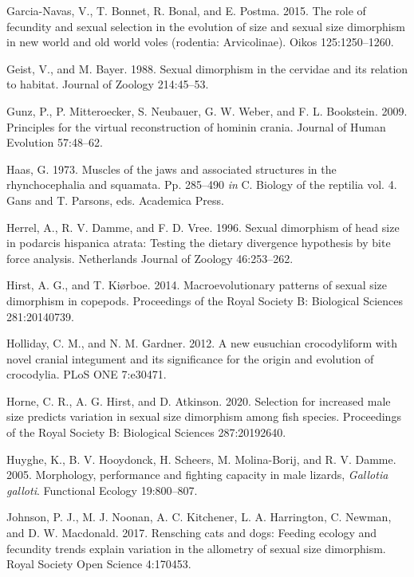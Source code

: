 \documentclass[]{article}
\begin{document}
\hypertarget{ref-Garcia-Navas2015}{}
Garcia-Navas, V., T. Bonnet, R. Bonal, and E. Postma. 2015. The role of
fecundity and sexual selection in the evolution of size and sexual size
dimorphism in new world and old world voles (rodentia: Arvicolinae).
Oikos 125:1250--1260.

\hypertarget{ref-Geist1988}{}
Geist, V., and M. Bayer. 1988. Sexual dimorphism in the cervidae and its
relation to habitat. Journal of Zoology 214:45--53.

\hypertarget{ref-Gunz2009}{}
Gunz, P., P. Mitteroecker, S. Neubauer, G. W. Weber, and F. L.
Bookstein. 2009. Principles for the virtual reconstruction of hominin
crania. Journal of Human Evolution 57:48--62.

\hypertarget{ref-Haas1973}{}
Haas, G. 1973. Muscles of the jaws and associated structures in the
rhynchocephalia and squamata. Pp. 285--490 \emph{in} C. Biology of the
reptilia vol. 4. Gans and T. Parsons, eds. Academica Press.

\hypertarget{ref-Herrel1996}{}
Herrel, A., R. V. Damme, and F. D. Vree. 1996. Sexual dimorphism of head
size in podarcis hispanica atrata: Testing the dietary divergence
hypothesis by bite force analysis. Netherlands Journal of Zoology
46:253--262.

\hypertarget{ref-Hirst2014}{}
Hirst, A. G., and T. Kiørboe. 2014. Macroevolutionary patterns of sexual
size dimorphism in copepods. Proceedings of the Royal Society B:
Biological Sciences 281:20140739.

\hypertarget{ref-Holliday2012}{}
Holliday, C. M., and N. M. Gardner. 2012. A new eusuchian crocodyliform
with novel cranial integument and its significance for the origin and
evolution of crocodylia. PLoS ONE 7:e30471.

\hypertarget{ref-Horne2020}{}
Horne, C. R., A. G. Hirst, and D. Atkinson. 2020. Selection for
increased male size predicts variation in sexual size dimorphism among
fish species. Proceedings of the Royal Society B: Biological Sciences
287:20192640.

\hypertarget{ref-HUYGHE2005}{}
Huyghe, K., B. V. Hooydonck, H. Scheers, M. Molina-Borij, and R. V.
Damme. 2005. Morphology, performance and fighting capacity in male
lizards, \emph{Gallotia galloti}. Functional Ecology 19:800--807.

\hypertarget{ref-Johnson2017}{}
Johnson, P. J., M. J. Noonan, A. C. Kitchener, L. A. Harrington, C.
Newman, and D. W. Macdonald. 2017. Rensching cats and dogs: Feeding
ecology and fecundity trends explain variation in the allometry of
sexual size dimorphism. Royal Society Open Science 4:170453.
\end{document}
